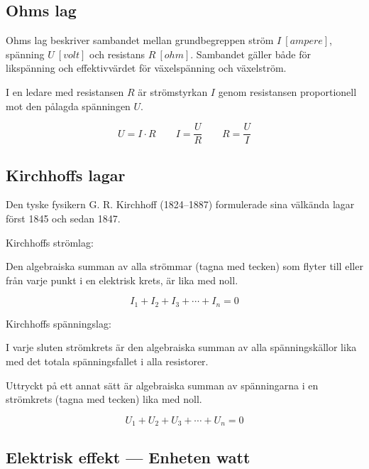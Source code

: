 \subsection{Ohms lag}

Ohms lag beskriver sambandet mellan grundbegreppen ström
\(I\ \unit{[ampere]}\), spänning \(U\ \unit{[volt]}\) och resistans
\(R\ \unit{[ohm]}\).
Sambandet gäller både för likspänning och effektivvärdet för växelspänning och
växelström.

I en ledare med resistansen \(R\) är strömstyrkan \(I\) genom resistansen
proportionell mot den pålagda spänningen \(U\).

\begin{equation*}
  U = I \cdot R \qquad
  I = \frac{U}{R} \qquad
  R = \frac{U}{I}
\end{equation*}

\subsection{Kirchhoffs lagar}

Den tyske fysikern G. R. Kirchhoff (1824--1887) formulerade sina välkända lagar
först 1845 och sedan 1847.

Kirchhoffs strömlag:

 Den algebraiska summan av alla strömmar (tagna med tecken) som flyter
 till eller från varje punkt i en elektrisk krets, är lika med noll.

\begin{equation*}
  I_1 + I_2 + I_3 + \cdots + I_n = 0
\end{equation*}

Kirchhoffs spänningslag:

I varje sluten strömkrets är den algebraiska summan av alla spänningskällor lika
med det totala spänningsfallet i alla resistorer.

Uttryckt på ett annat sätt är algebraiska summan av spänningarna i en
strömkrets (tagna med tecken) lika med noll.

\begin{equation*}
  U_1 + U_2 + U_3 + \cdots + U_n = 0
\end{equation*}

\subsection{Elektrisk effekt --- Enheten watt}

